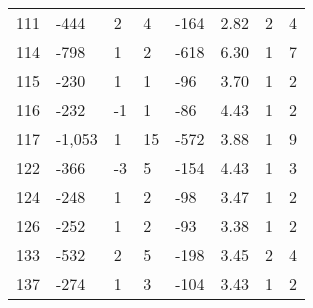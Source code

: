 \begin{appendices}
\begin{longtable}[c]{@{}llllllll@{}}
	111                      & -444                          & 2                            & 4                            & -164                     & 2.82                    & 2                    & 4                       \\
	114                      & -798                          & 1                            & 2                            & -618                     & 6.30                    & 1                    & 7                       \\
	115                      & -230                          & 1                            & 1                            & -96                      & 3.70                    & 1                    & 2                       \\
	116                      & -232                          & -1                           & 1                            & -86                      & 4.43                    & 1                    & 2                       \\
	117                      & -1,053                        & 1                            & 15                           & -572                     & 3.88                    & 1                    & 9                       \\
	122                      & -366                          & -3                           & 5                            & -154                     & 4.43                    & 1                    & 3                       \\
	124                      & -248                          & 1                            & 2                            & -98                      & 3.47                    & 1                    & 2                       \\
	126                      & -252                          & 1                            & 2                            & -93                      & 3.38                    & 1                    & 2                       \\
	133                      & -532                          & 2                            & 5                            & -198                     & 3.45                    & 2                    & 4                       \\
	137                      & -274                          & 1                            & 3                            & -104                     & 3.43                    & 1                    & 2                       \\

\end{longtable}
\end{appendices}
